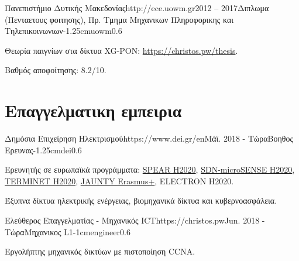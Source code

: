 \documentclass{mycv}
\begin{document}
	\begin{EntryDatedLogo}{Πανεπιστήμιο Δυτικής Μακεδονίας}{http://ece.uowm.gr}{2012 -- 2017}{Διπλωμα (Πενταετους φοιτησης), Πρ. Τμημα Μηχανικων Πληροφορικης και Τηλεπικοινωνιων}{-1.25cm}{uowm}{0.6}
		\begin{Itemize}
			\item Θεωρία παιγνίων στα δίκτυα XG-PON: \url{https://christos.pw/thesis}.
			\item Βαθμός αποφοίτησης: 8.2/10.
		\end{Itemize}
	\end{EntryDatedLogo}
	
	\section{Επαγγελματικη εμπειρια}
	\begin{EntryDatedLogo}{Δημόσια Επιχείρηση Ηλεκτρισμού}{https://www.dei.gr/en}{Μάϊ. 2018 - Τώρα}{Βοηθος Ερευνας}{-1.25cm}{dei}{0.6}
	\begin{Itemize}
		\item Ερευνητής σε ευρωπαϊκά προγράμματα: \href{https://www.spear2020.eu/}{SPEAR H2020}, \href{https://www.sdnmicrosense.eu/}{SDN-microSENSE H2020}, \href{https://terminet-h2020.eu/}{TERMINET H2020}, \href{https://www.jaunty.eu/}{JAUNTY Erasmus+}, ELECTRON H2020.
		\item Έξυπνα δίκτυα ηλεκτρικής ενέργειας, βιομηχανικά δίκτυα και κυβερνοασφάλεια.
	\end{Itemize}
	\end{EntryDatedLogo}

	\vspace*{0.5cm}

	\begin{EntryDatedLogo}{Ελεύθερος Επαγγελματίας - Μηχανικός ICT}{https://christos.pw}{Jun. 2018 - Τώρα}{Μηχανικος L1}{-1cm}{engineer}{0.6}
		\begin{Itemize}
			\item Εργολήπτης μηχανικός δικτύων με πιστοποίηση CCNA.
		\end{Itemize}
	\end{EntryDatedLogo}

	\vspace*{0.5cm}	
\end{document}
